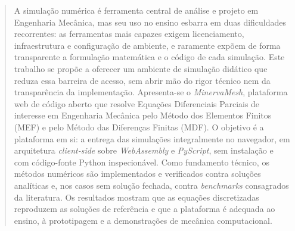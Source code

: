 \begin{abstract}

A simulação numérica é ferramenta central de análise e projeto em Engenharia Mecânica, mas seu uso no ensino esbarra em duas dificuldades recorrentes: as ferramentas mais capazes exigem licenciamento, infraestrutura e configuração de ambiente, e raramente expõem de forma transparente a formulação matemática e o código de cada simulação. Este trabalho se propõe a oferecer um ambiente de simulação didático que reduza essa barreira de acesso, sem abrir mão do rigor técnico nem da transparência da implementação. Apresenta-se o \textit{MinervaMesh}, plataforma web de código aberto que resolve Equações Diferenciais Parciais de interesse em Engenharia Mecânica pelo Método dos Elementos Finitos (MEF) e pelo Método das Diferenças Finitas (MDF). O objetivo é a plataforma em si: a entrega das simulações integralmente no navegador, em arquitetura \textit{client-side} sobre \textit{WebAssembly} e \textit{PyScript}, sem instalação e com código-fonte Python inspecionável. Como fundamento técnico, os métodos numéricos são implementados e verificados contra soluções analíticas e, nos casos sem solução fechada, contra \textit{benchmarks} consagrados da literatura. Os resultados mostram que as equações discretizadas reproduzem as soluções de referência e que a plataforma é adequada ao ensino, à prototipagem e a demonstrações de mecânica computacional.

\end{abstract}
